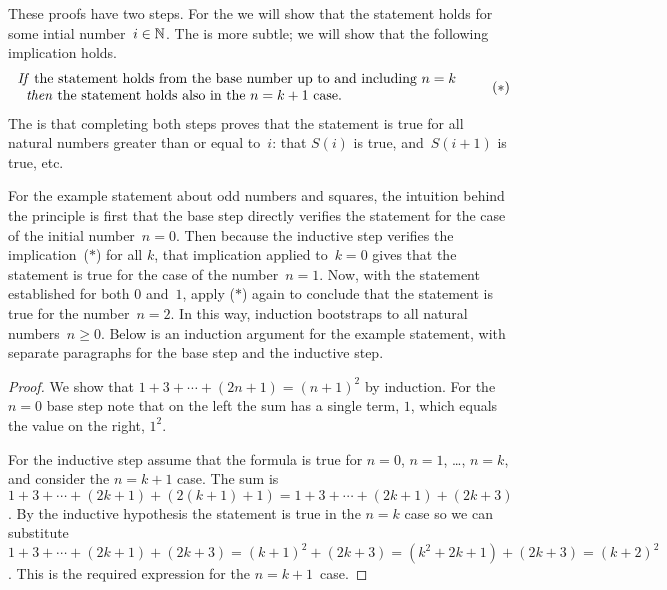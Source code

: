 \documentclass{ibl}  %
\begin{document}
These proofs have two steps.
For the  
we will show that the statement holds for some intial number~$i\in\mathbb{N}$.
The  is more subtle;
we will show that the following implication holds.
\begin{equation*}
  \begin{tabular}{l} 
  \textit{If} the statement holds from the
   base number up to and including $n=k$  \\
  \hspace*{0.618em}\textit{then} the statement holds also in the~$n=k+1$ case.
  \end{tabular}
  \tag{$*$}
\end{equation*}
The  is that
completing both steps proves 
that the statement is true for all natural
numbers greater than or equal to~$i$: 
that $S(i)$ is true, and~$S(i+1)$ is true, etc.

For the example statement about odd numbers and squares, 
the intuition behind the principle is first that the base step
directly verifies the statement for the case of the initial number~$n=0$.
Then because the inductive step verifies the implication~($*$) for all $k$, 
that implication applied to~$k=0$ gives 
that the statement is true for the case of the number~$n=1$. 
Now, with the statement established for both $0$ and~$1$, 
apply ($*$) again to conclude that the statement is true for the number~$n=2$.
In this way, induction bootstraps to all natural numbers~$n\geq 0$.
Below is an induction argument for the example statement, 
with separate paragraphs for the base step and the inductive step.

\begin{proof}
  We show that $1+3+\cdots+(2n+1)=(n+1)^2$ by induction.
  For the $n=0$ base step note that on the left the sum has a single term, $1$,
  which equals the value on the right, $1^2$.

  For the inductive step assume that the 
  formula is true for $n=0$, $n=1$, \ldots, $n=k$, and 
  consider the $n=k+1$ case.
  The sum is $1+3+\cdots+(2k+1)+(2(k+1)+1)=1+3+\cdots+(2k+1)+(2k+3)$.
  By the inductive hypothesis the statement is true in the $n=k$ case
  so we can substitute 
  $1+3+\cdots+(2k+1)+(2k+3)=(k+1)^2+(2k+3)=(k^2+2k+1)+(2k+3)=(k+2)^2$.
  This is the required expression for the $n=k+1$~case.
\end{proof}
\end{document}
